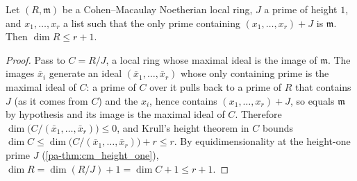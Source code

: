 \begin{theorem}
  \label{pa-thm:krull_codim_count}
  \leanok

  Let \((R, \mathfrak m)\) be a Cohen--Macaulay Noetherian local ring, \(J\) a
  prime of height \(1\), and \(x_1, \dots, x_r\) a list such that the only prime
  containing \((x_1, \dots, x_r) + J\) is \(\mathfrak m\). Then
  \(\dim R \le r + 1\).
\end{theorem}
\begin{proof}
  \leanok
  Pass to \(C = R/J\), a local ring whose maximal ideal is the image of
  \(\mathfrak m\). The images \(\bar x_i\) generate an ideal
  \((\bar x_1, \dots, \bar x_r)\) whose only containing prime is the maximal
  ideal of \(C\): a prime of \(C\) over it pulls back to a prime of \(R\) that
  contains \(J\) (as it comes from \(C\)) and the \(x_i\), hence contains
  \((x_1, \dots, x_r) + J\), so equals \(\mathfrak m\) by hypothesis and its
  image is the maximal ideal of \(C\). Therefore
  \(\dim\bigl(C/(\bar x_1, \dots, \bar x_r)\bigr) \le 0\), and Krull's height
  theorem in \(C\) bounds \(\dim C \le \dim\bigl(C/(\bar x_1, \dots, \bar x_r)\bigr)
  + r \le r\). By equidimensionality at the height-one prime \(J\)
  (\ref{pa-thm:cm_height_one}), \(\dim R = \dim(R/J) + 1 = \dim C + 1 \le r + 1\).
\end{proof}


